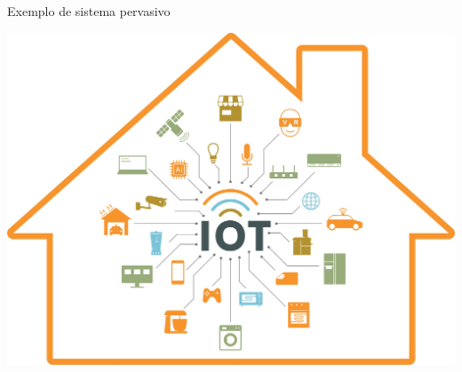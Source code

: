 \documentclass[compress]{beamer}
\begin{document}

\begin{frame}{Exemplo de sistema pervasivo}

\centering \includegraphics[width=\textwidth]{images/iot.jpg}

\end{frame}
\end{document}
